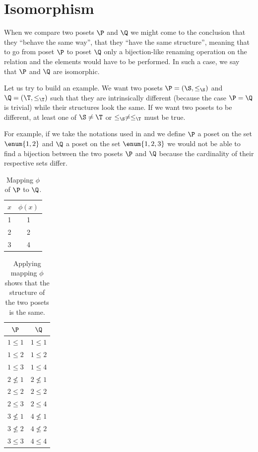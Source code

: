 \section{Isomorphism}

When we compare two posets $\P$ and $\Q$ we might come to the conclusion that
they ``behave the same way'', that they ``have the same structure'',
meaning that to go from poset $\P$ to poset $\Q$ only a bijection-like renaming
operation on the relation and the elements would have to be performed. In such
a case, we say that $\P$ and $\Q$ are isomorphic.

Let us try to build an example. We want two posets $\P = (\S, \le_{\S})$ and $\Q =
(\T, \le_{\T})$ such that they are intrinsically different (because the case
$\P = \Q$ is trivial) while their structures look the same. If we want two posets
to be different, at least one of $\S \neq \T$ or $\le_{\S} \neq \le_{\T}$ must be true.

For example, if we take the notations used in  and we
define $\P$ a poset on the set $\enum{1, 2}$ and $\Q$ a poset on the set $\enum{1, 2, 3}$
we would not be able to find a bijection between the two posets $\P$ and $\Q$
because the cardinality of their respective sets differ.

\begin{table}
\centering
\caption{Mapping $\phi$ of $\P$ to $\Q$.}
\label{table:poset:iso:a}
\begin{tabular}{c|c}
	$x$ & $\phi(x)$ \\
	\hline
	1 & 1 \\
	2 & 2 \\
	3 & 4 \\
\end{tabular}
\end{table}

\begin{table}
\centering
\caption{Applying mapping $\phi$ shows that the structure of the two posets is
the same.}
\label{table:poset:iso:b}
\begin{tabular}{c|c}
	$\P$ & $\Q$\\
	\hline
	$1 \le 1$   & $1 \le 1$\\
	$1 \le 2$   & $1 \le 2$\\
	$1 \le 3$   & $1 \le 4$\\
	$2 \nleq 1$ & $2 \nleq 1$\\
	$2 \le 2$   & $2 \le 2$\\
	$2 \le 3$   & $2 \le 4$\\
	$3 \nleq 1$ & $4 \nleq 1$\\
	$3 \nleq 2$ & $4 \nleq 2$\\
	$3 \le 3$   & $4 \le 4$\\
\end{tabular}
\end{table}


